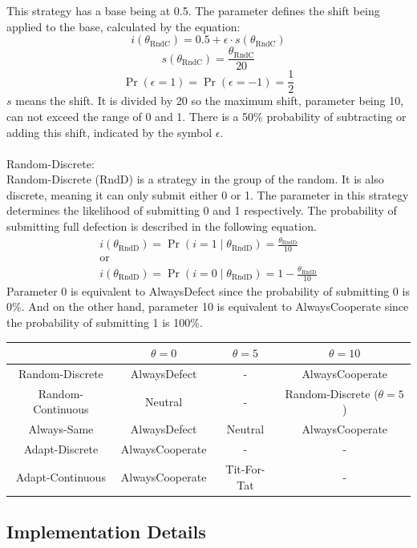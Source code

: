 \documentclass{article}
\begin{document}
This strategy has a base being at 0.5.
The parameter defines the shift being applied to the base, calculated by the equation:
$$i(\theta_{\mathrm{RndC}}) = 0.5 + \epsilon \cdot s(\theta_{\mathrm{RndC}})$$
$$s(\theta_{\mathrm{RndC}}) = \frac{\theta_{\mathrm{RndC}}}{20}$$
$$\Pr(\epsilon = 1) = \Pr(\epsilon = -1) = \frac{1}{2}$$
$s$ means the shift.
It is divided by 20 so the maximum shift, parameter being 10, can not exceed the range of 0 and 1.
There is a 50\% probability of subtracting or adding this shift, indicated by the symbol $\epsilon$.\\
		\\Random-Discrete:\\
Random-Discrete (RndD) is a strategy in the group of the random.
It is also discrete, meaning it can only submit either 0 or 1.
The parameter in this strategy determines the likelihood of submitting 0 and 1 respectively.
The probability of submitting full defection is described in the following equation.
$$
\begin{array}{c}
i(\theta_{\mathrm{RndD}}) = \Pr(i = 1 \mid \theta_{\mathrm{RndD}}) = \frac{\theta_{\mathrm{RndD}}}{10}\\
\mathrm{or}\\
i(\theta_{\mathrm{RndD}}) = \Pr(i = 0 \mid \theta_{\mathrm{RndD}}) = 1 - \frac{\theta_{\mathrm{RndD}}}{10}
\end{array}
$$
Parameter 0 is equivalent to AlwaysDefect since the probability of submitting 0 is 0\%.
And on the other hand, parameter 10 is equivalent to AlwaysCooperate since the probability of submitting 1 is 100\%.\\

\begin{center}
\begin{tabular}{ c|c|c|c }
   & $\theta = 0$ & $\theta = 5$ & $\theta = 10$ \\ 
   \hline
	Random-Discrete & AlwaysDefect & - & AlwaysCooperate \\  
   \hline
	Random-Continuous & Neutral & - & Random-Discrete ($\theta = 5$) \\
   \hline
	Always-Same & AlwaysDefect & Neutral & AlwaysCooperate \\
   \hline
	Adapt-Discrete & AlwaysCooperate & - & -\\
   \hline
	Adapt-Continuous & AlwaysCooperate & Tit-For-Tat & -
\end{tabular}
\end{center}

\subsection{Implementation Details}
\end{document}
